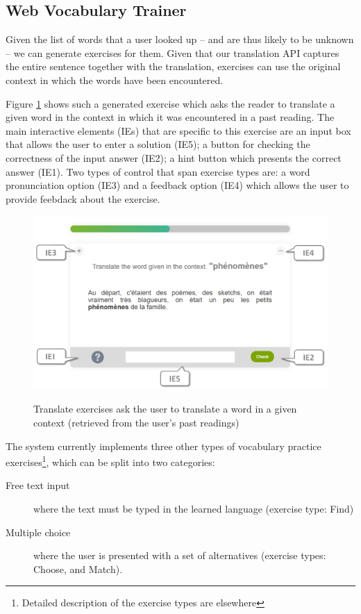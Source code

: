 
\newpage
\subsection{Web Vocabulary Trainer}

Given the list of words that a user looked up -- and are thus likely to be unknown -- we can generate exercises for them. Given that our translation API captures the entire sentence together with the translation, exercises can use the original context in which the words have been encountered.

Figure \ref{exercise_translate} shows such a generated exercise which asks the reader to translate a given word in the context in which it was encountered in a past reading. The main interactive elements (IEs) that are specific to this exercise are an input box that allows the user to enter a solution (IE5); a button for checking the correctness of the input answer (IE2); a hint button which presents the correct answer (IE1). Two types of control that span exercise types are: a word pronunciation option (IE3) and a feedback option (IE4) which allows the user to provide feebdack about the exercise.

\begin{figure}[h!]
\centering
  \includegraphics[width=0.9\columnwidth]{figures/exercise_translate}
  \caption{Translate exercises ask the user to translate a word in a given context (retrieved from the user's past readings)}{
  \label{exercise_translate}
  }
\end{figure}

The system currently implements three other types of vocabulary practice exercises\footnote{Detailed description of the exercise types are elsewhere\cite{Avagyan17a-blocks}}, which can be split into two categories: 
\begin{description}
	
	\item [Free text input] where the text must be typed in the learned language (exercise type: Find)

	\item [Multiple choice] where the user is presented with a set of alternatives (exercise types: Choose, and Match). 

\end{description}

